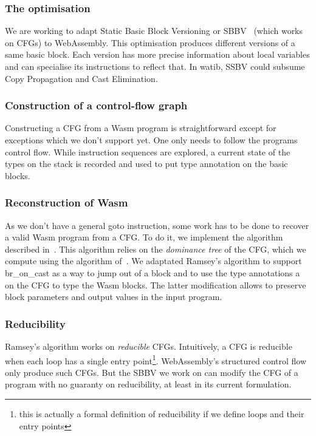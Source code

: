 \documentclass[a4paper,11pt]{article}
\begin{document}
\subsubsection{The optimisation}
We are working to adapt Static Basic Block Versioning or
SBBV~\cite{melanccon2024static} (which works on CFGs) to WebAssembly. This
optimisation produces different versions of a same basic block. Each version has
more precise information about local variables and can specialise its
instructions to reflect that. In \textsf{watib}, SSBV could subsume Copy
Propagation and Cast Elimination.

\subsubsection{Construction of a control-flow graph}
Constructing a CFG from a Wasm program is straightforward except for exceptions
which we don't support yet. One only needs to follow the programs control flow.
While instruction sequences are explored, a current state of the types on the
stack is recorded and used to put type annotation on the basic blocks.

\subsubsection{Reconstruction of Wasm}
As we don't have a general goto instruction, some work has to be done to recover
a valid Wasm program from a CFG. To do it, we implement the algorithm described
in~\cite{ramsey2022beyond}. This algorithm relies on the \emph{dominance tree}
of the CFG, which we compute using the algorithm of~\cite{cooper2001simple}. We
adaptated Ramsey's algorithm to support \textsf{br\_on\_cast} as a way to jump
out of a block and to use the type annotations a on the CFG to type the Wasm
blocks. The latter modification allows to preserve block parameters and output
values in the input program.

\subsubsection{Reducibility}
Ramsey's algorithm works on \emph{reducible} CFGs. Intuitively, a CFG is
reducible when each loop has a single entry point\footnote{this is actually a
formal definition of reducibility if we define loops and their entry points}.
WebAssembly's structured control flow only produce such CFGs. But the SBBV we
work on can modify the CFG of a program with no guaranty on reducibility, at
least in its current formulation.
\end{document}
